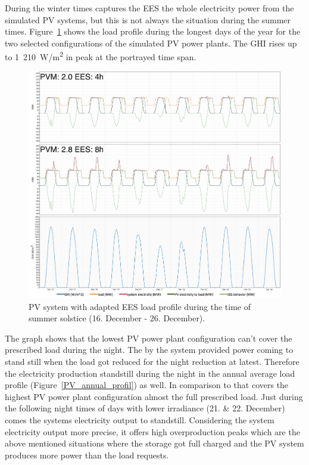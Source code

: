 During the winter times captures the EES the whole electricity power from the simulated PV systems, but this is not always the situation during the summer times. Figure~\ref{PV_summer_load} shows the load profile during the longest days of the year for the two selected configurations of the simulated PV power plants. The GHI rises up to 1~210~W/m\textsuperscript{2} in peak at the portrayed time span.

\begin{figure}[htbp]
\centering
\includegraphics[width=1\linewidth]{FIG/PV_summer_load}
\caption[PV system with adapted EES load profile during the time of summer solstice (16. December - 26. December).]{PV system with adapted EES load profile during the time of summer solstice (16. December - 26. December).}\label{PV_summer_load}
\end{figure}
The graph shows that the lowest PV power plant configuration can't cover the prescribed load during the night. The by the system provided power coming to stand still when the load got reduced for the night reduction at latest. Therefore the electricity production standstill during the night in the annual average load profile (Figure~\ref{PV_annual_profil}) as well. In comparison to that covers the highest PV power plant configuration almost the full prescribed load. Just during the following night times of days with lower irradiance (21. \& 22. December) comes the systems electricity output to standstill. Considering the system electricity output more precise, it offers high overproduction peaks which are the above mentioned situations where the storage got full charged and the PV system produces more power than the load requests.  

